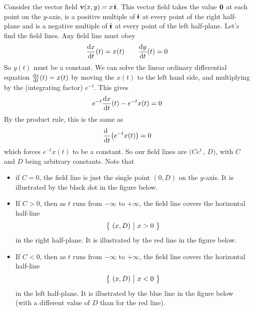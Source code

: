 \begin{eg}\label{ex:badStreamB}
Consider the vector field $\mathbf{v}(x,y)=x\,\hat{\pmb{\imath}}$. This vector field takes the value $\mathbf{0}$ at each point on the $y$-axis, is a positive multiple of $\hat{\pmb{\imath}}$
at every point of the right half-plane and is a negative multiple of 
$\hat{\pmb{\imath}}$ at every point of the left half-plane. Let's find the field lines.
Any field line must obey
\begin{align*}
\diff{x}{t}(t)=x(t)\qquad \diff{y}{t}(t)=0
\end{align*}
So $y(t)$ must be a constant. We can solve the linear ordinary
differential equation $\diff{x}{t}(t)=x(t)$ by moving
the $x(t)$ to the left hand side, and multiplying by the (integrating factor)
$e^{-t}$. This gives
\begin{equation*}
e^{-t}\diff{x}{t}(t)-e^{-t} x(t)=0
\end{equation*}
By the product rule, this is the same as
\begin{equation*}
\diff{\hfill}{t}\big(e^{-t}x(t)\big)=0
\end{equation*}
which forces $e^{-t}x(t)$ to be a constant. So our field lines are
$\big(Ce^t\,,\,D\big)$, with $C$ and $D$ being arbitrary constants.
Note that
\begin{itemize}
\item
if $C=0$, the field line is just the single point $(0,D)$ on the $y$-axis.
It is illustrated by the black dot in the figure below.

\item
If $C>0$, then as $t$ runs from $-\infty$ to $+\infty$, the field line
covers the horizontal half-line
\begin{equation*}
\big\{ \ (x,D)\ \big|\ x>0\ \big\}
\end{equation*}
in the right half-plane.
It is illustrated by the red line in the figure below.


\item
If $C<0$, then as $t$ runs from $-\infty$ to $+\infty$, the field line
covers the horizontal half-line
\begin{equation*}
\big\{ \ (x,D)\ \big|\ x<0\ \big\}
\end{equation*}
in the left half-plane.
It is illustrated by the blue line in the figure below (with a different value of $D$ than for the red line).


\end{itemize}


\end{eg}
